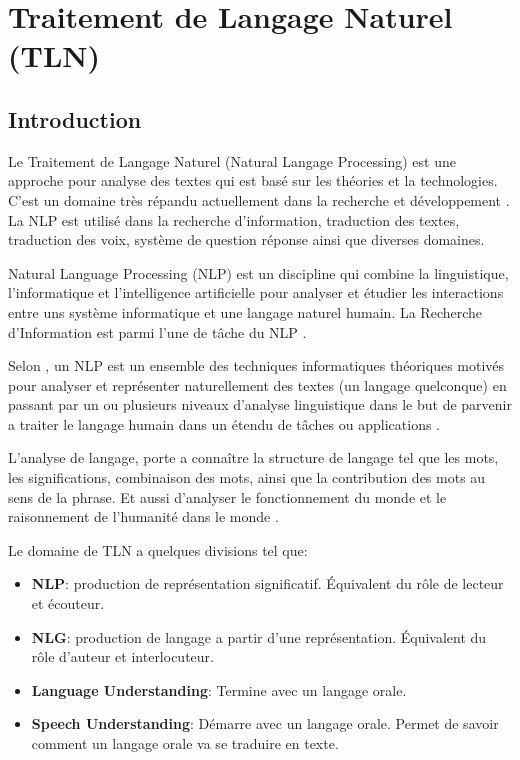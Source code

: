 \chapter{Traitement de Langage Naturel (TLN)}
\section{Introduction}
Le Traitement de Langage Naturel (Natural Langage Processing) est une approche pour analyse des textes qui est basé sur les théories et la technologies. C'est un domaine très répandu actuellement dans la recherche et développement \citep{natural-language-processing}. La NLP est utilisé dans la recherche d'information, traduction des textes, traduction des voix, système de question réponse ainsi que diverses domaines.

\begin{definition}[NLP]
    Natural Language Processing (NLP) est un discipline qui combine la linguistique, l'informatique et l'intelligence artificielle pour analyser et étudier les interactions entre uns système informatique et une langage naturel humain. La Recherche d'Information est parmi l'une de tâche du NLP \citep{art-nlp}.
\end{definition}

\begin{definition}[NLP]
    Selon \citeauthor{natural-language-processing}, un NLP est un ensemble des techniques informatiques théoriques motivés pour analyser et représenter naturellement des textes (un langage quelconque) en passant par un ou plusieurs niveaux d'analyse linguistique dans le but de parvenir a traiter le langage humain dans un étendu de tâches ou applications \citep{natural-language-processing}.
\end{definition}

L'analyse de langage, porte a connaître la structure de langage tel que les mots, les significations, combinaison des mots, ainsi que la contribution des mots au sens de la phrase. Et aussi d'analyser le fonctionnement du monde et le raisonnement de l'humanité dans le monde \citep{automatic-nlp}.

Le domaine de TLN a quelques divisions tel que:
\begin{itemize}
    \item \textbf{NLP}: production de représentation significatif. Équivalent du rôle de lecteur et écouteur.
    \item \textbf{NLG}: production de langage a partir d'une représentation. Équivalent du rôle d'auteur et interlocuteur.
    \item \textbf{Language Understanding}: Termine avec un langage orale.
    \item \textbf{Speech Understanding}: Démarre avec un langage orale. Permet de savoir comment un langage orale va se traduire en texte.
\end{itemize}

